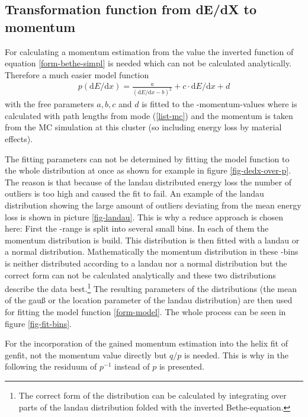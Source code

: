 \subsection{Transformation function from dE/dX to momentum}

For calculating a momentum estimation from the \dedx value the inverted function of equation \ref{form-bethe-simpl} is needed which can not be calculated analytically. Therefore a much easier model function
\begin{align}
 p(\mathrm{d}E/\mathrm{d} x) = \frac{a}{(\mathrm{d}E/\mathrm{d} x - b)^2} + c \cdot \mathrm{d}E/\mathrm{d} x + d \label{form-model}
\end{align}
with the free parameters $a, b, c$ and $d$ is fitted to the \dedx-momentum-values where \dedx is calculated with path lengths from mode (\ref{list-mc}) and the momentum is taken from the MC simulation at this cluster (so including energy loss by material effects).

The fitting parameters can not be determined by fitting the model function to the whole distribution at once as shown for example in figure \ref{fig-dedx-over-p}. The reason is that because of the landau distributed energy loss the number of outliers is too high and caused the fit to fail. An example of the landau distribution showing the large amount of outliers deviating from the mean energy loss is shown in picture \ref{fig-landau}. This is why a reduce approach is chosen here: First the \dedx-range is split into several small bins. In each of them the momentum distribution is build. This distribution is then fitted with a landau or a normal distribution. Mathematically the momentum distribution in these \dedx-bins is neither distributed according to a landau nor a normal distribution but the correct form can not be calculated analytically and these two distributions describe the data best.\footnote{The correct form of the distribution can be calculated by integrating over parts of the landau distribution folded with the inverted Bethe-equation.} The resulting parameters of the distributions (the mean of the gauß or the location parameter of the landau distribution\cite{landau}) are then used for fitting the model function \ref{form-model}. The whole process can be seen in figure \ref{fig-fit-bins}.


For the incorporation of the gained momentum estimation into the helix fit of genfit, not the momentum value directly but $q/p$ is needed. This is why in the following the residuum of $p^{-1}$ instead of $p$ is presented.


